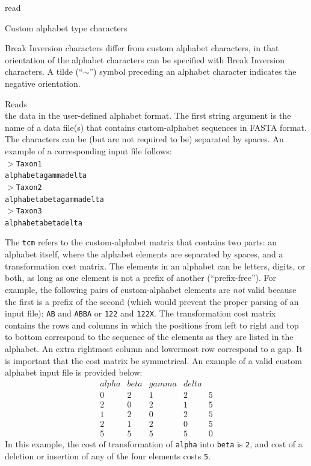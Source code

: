\begin{command}{read}{}
\begin{arguments}
\begin{argumentgroup}{Custom alphabet type characters}
\begin{statement}
Break Inversion characters differ from custom alphabet characters, in that orientation
of the alphabet characters can be specified with Break Inversion characters. A tilde 
(``$\sim$'') symbol preceding an alphabet character indicates the negative 
orientation. 
\end{statement}

{Reads \\ the data in the user-defined alphabet format. The first string argument is
the name of a data file(s) that contains custom-alphabet sequences in FASTA format. 
The characters can be (but are not required to be) separated by spaces.
An example of a corresponding input file follows:\\

\texttt{$>$Taxon1\\
\indent alphabetagammadelta\\
\indent $>$Taxon2\\
\indent alphabetabetagammadelta\\
\indent $>$Taxon3\\
\indent alphabetabetadelta\\}

The \texttt{tcm} refers to the custom-alphabet matrix that contains two parts:
an alphabet itself, where the alphabet elements are separated by spaces, and a
transformation cost matrix. The elements in an alphabet can be letters, digits, or
both, as long as one element is not a prefix of another (``prefix-free''). For
example, the following pairs of custom-alphabet elements are \emph{not} valid
because the first is a prefix of the second (which would prevent the proper parsing of
an input file): \texttt{AB} and \texttt{ABBA} or \texttt{122} and \texttt{122X}.
The transformation cost matrix contains the rows and columns in which the
positions from left to right and top to bottom correspond to the sequence of the
elements as they are listed in the alphabet. An extra rightmost column and lowermost
row correspond to a gap. It is important that the cost matrix be symmetrical. An example 
of a valid custom alphabet input file is provided below:
\\
\begin{equation*}
\begin{array}{lllll}
alpha & beta & gamma & delta &  \\
0 &   2 &  1 &   2 &   5 \\
2 &   0 &  2 &   1 &   5 \\
1 &   2 &  0 &   2 &   5 \\
2 &   1 &  2 &   0 &   5 \\
5 &   5 &  5 &   5 &   0
\end{array}
\end{equation*} 
In this example, the cost of transformation of \texttt{alpha} into \texttt{beta} is \texttt{2},
and cost of a deletion or insertion of any of the four elements costs \texttt{5}.

}
\end{argumentgroup}
\end{arguments}
\end{command}
